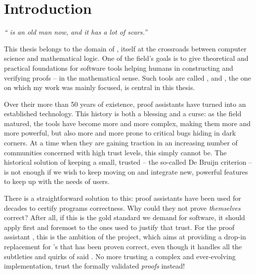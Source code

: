 \chapter{Introduction}
\label{chap:intro-en}

\emph{“ is an old man now, and it has a lot of scars.”}
\vspace{-1.5em}
\begin{flushright}
\end{flushright}

\margintoc[4em]

This thesis belongs to the domain of ,%
itself at the crossroads between computer science and mathematical logic.
One of the field’s goals is to give theoretical and practical foundations
for software tools helping humans in constructing and verifying proofs –
in the mathematical sense.
Such tools are called , and , the one
on which my work was mainly focused, is central in this thesis.

Over their more than 50 years of existence, proof assistants have
turned into an established technology. This history is both a blessing and a curse: as
the field matured, the tools have become more and more complex, making them more and more
powerful, but also more and more prone to critical bugs hiding in dark corners. At a time
when they are gaining traction in an increasing number of communities
concerned with high trust levels, this simply cannot be.
The historical solution of keeping a small, trusted 
– the so-called De Bruijn criterion –
is not enough if we wish to keep moving on and integrate new, powerful features
to keep up with the needs of users.

There is a straightforward solution to this:
proof assistants have been used for decades to certify programs correctness.
Why could they not prove \emph{themselves} correct? After all, if this is
the gold standard we demand for software, it should apply first and foremost to the ones
used to justify that trust. For the proof assistant ,
this is the ambition of the  project,
which aims at providing a drop-in replacement for ’s  that has been
proven correct,
even though it handles all the subtleties and quirks of said .
No more trusting a complex and ever-evolving implementation, trust the formally validated
\emph{proofs} instead!

